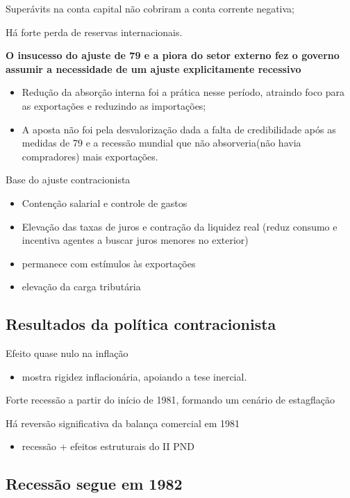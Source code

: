 \documentclass[a4paper,12pt]{article}[abntex2]
\begin{document}
Superávits na conta capital não cobriram a conta corrente negativa;

Há forte perda de reservas internacionais.

\textbf{O insucesso do ajuste de 79 e a piora do setor externo fez o governo assumir a necessidade de um ajuste explicitamente recessivo}\begin{itemize}
    \item Redução da absorção interna foi a prática nesse período, atraindo foco para as exportações e reduzindo as importações;
    \item A aposta não foi pela desvalorização dada a falta de credibilidade após as medidas de 79 e a recessão mundial que não absorveria(não havia compradores) mais exportações.
\end{itemize}

Base do ajuste contracionista\begin{itemize}
    \item Contenção salarial e controle de gastos
    \item Elevação das taxas de juros e contração da liquidez real (reduz consumo e incentiva agentes a buscar juros menores no exterior)
    \item permanece com estímulos às exportações
    \item elevação da carga tributária

\end{itemize}

\subsection{\textbf{Resultados da política contracionista}}
Efeito quase nulo na inflação\begin{itemize}
    \item mostra rigidez inflacionária, apoiando a tese inercial. 
\end{itemize}

Forte recessão a partir do início de 1981, formando um cenário de estagflação

Há reversão significativa da balança comercial em 1981  \begin{itemize}
    \item recessão + efeitos estruturais do II PND 
\end{itemize}

\subsection{\textbf{Recessão segue em 1982}}
\end{document}
